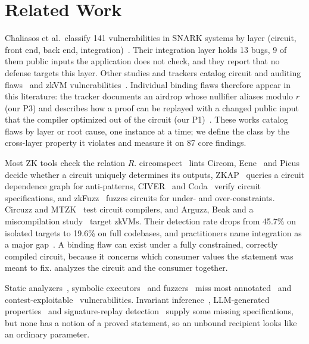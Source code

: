 \section{Related Work}\label{sec:related}

Chaliasos et al.\ classify 141 vulnerabilities in SNARK systems by layer
(circuit, front end, back end, integration)~\cite{sok-snark-bugs}. Their
integration layer holds 13 bugs, 9 of them public inputs the application
does not check, and they report that no defense targets this layer. Other
studies and trackers catalog circuit and auditing
flaws~\cite{zkp-vuln-audit,zk-bug-tracker,zkbugs} and zkVM
vulnerabilities~\cite{zkvm-study}. Individual binding flaws therefore appear
in this literature: the tracker documents an airdrop whose nullifier aliases
modulo $r$ (our P3) and describes how a proof can be replayed with a changed
public input that the compiler optimized out of the circuit (our
P1)~\cite{zk-bug-tracker}.
These works catalog flaws by layer or root cause, one instance at a time; we
define the class by the cross-layer property it violates and measure it on
87 core findings.

Most ZK tools check the relation $R$. circomspect~\cite{circomspect} lints
Circom, Ecne~\cite{ecne} and Picus~\cite{picus} decide whether a circuit
uniquely determines its outputs, ZKAP~\cite{zkap} queries a circuit
dependence graph for anti-patterns, CIVER~\cite{civer} and
Coda~\cite{coda} verify circuit specifications, and zkFuzz~\cite{zkfuzz}
fuzzes circuits for under- and over-constraints. Circuzz and
MTZK~\cite{circuzz,mtzk} test circuit compilers, and Arguzz, Beak and a
miscompilation study~\cite{arguzz,beak,zkvm-miscompile} target zkVMs. Their detection rate drops from 45.7\% on isolated targets to 19.6\% on
full codebases, and practitioners name integration as a major
gap~\cite{zk-tools-sok}.
A binding flaw can exist under a fully constrained, correctly compiled
circuit, because it concerns which consumer values the statement was meant
to fix. \tool{} analyzes the circuit and the consumer together.

Static analyzers~\cite{slither,securify}, symbolic
executors~\cite{mythril,manticore} and fuzzers~\cite{echidna,ityfuzz,foundry}
miss most annotated~\cite{smartbugs} and contest-exploitable~\cite{exploitable-bugs}
vulnerabilities. Invariant inference~\cite{smartinv},
LLM-generated properties~\cite{propertygpt} and signature-replay
detection~\cite{lasir} supply some missing specifications, but none has a
notion of a proved statement, so an unbound recipient looks like an ordinary
parameter.


